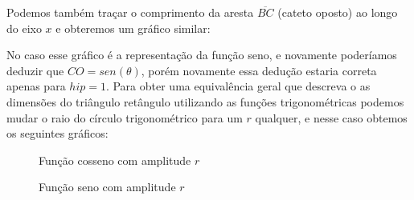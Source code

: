 \begin{multicols*}{2}
    Podemos também traçar o comprimento da aresta $\overline{BC}$ (cateto oposto)
    ao longo do eixo $x$ e obteremos um gráfico similar:
    \begin{figure}[H]
        \centering
    \end{figure}

    No caso esse gráfico é a representação da função seno, e novamente poderíamos
    deduzir que $CO = sen(\theta)$, porém novamente essa dedução estaria correta
    apenas para $hip = 1$. Para obter uma equivalência geral que descreva o
    as dimensões do triângulo retângulo utilizando as funções trigonométricas
    podemos mudar o raio do círculo trigonométrico para um $r$ qualquer,
    e nesse caso obtemos os seguintes gráficos:

    \begin{figure}[H]
        \centering
        \caption{Função cosseno com amplitude $r$}
    \end{figure}

    \begin{figure}[H]
        \centering
        \caption{Função seno com amplitude $r$}
    \end{figure}


\end{multicols*}
